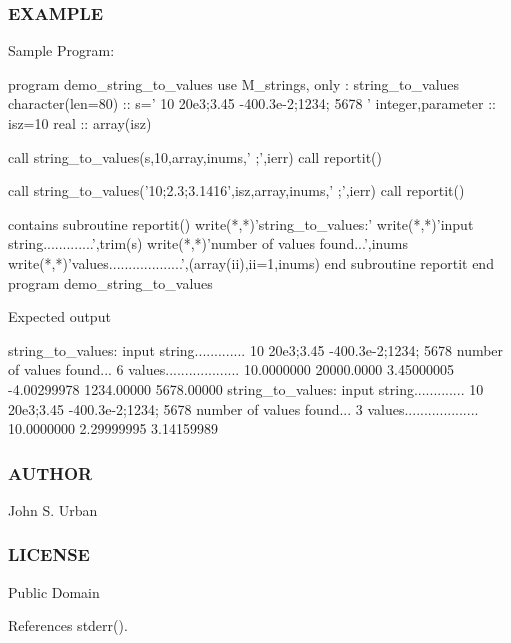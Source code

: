 \subsubsection*{E\+X\+A\+M\+P\+LE}

Sample Program\+: \begin{DoxyVerb} program demo_string_to_values
  use M_strings, only : string_to_values
  character(len=80)  :: s=' 10 20e3;3.45 -400.3e-2;1234; 5678 '
  integer,parameter  :: isz=10
  real               :: array(isz)

  call string_to_values(s,10,array,inums,' ;',ierr)
  call reportit()

  call string_to_values('10;2.3;3.1416',isz,array,inums,' ;',ierr)
  call reportit()

  contains
     subroutine reportit()
        write(*,*)'string_to_values:'
        write(*,*)'input string.............',trim(s)
        write(*,*)'number of values found...',inums
        write(*,*)'values...................',(array(ii),ii=1,inums)
     end subroutine reportit
 end program demo_string_to_values
\end{DoxyVerb}


Expected output \begin{DoxyVerb}string_to_values:
input string............. 10 20e3;3.45 -400.3e-2;1234; 5678
number of values found...           6
values...................   10.0000000  20000.0000  3.45000005  -4.00299978  1234.00000  5678.00000
string_to_values:
input string............. 10 20e3;3.45 -400.3e-2;1234; 5678
number of values found...           3
values...................   10.0000000  2.29999995  3.14159989
\end{DoxyVerb}
 \subsubsection*{A\+U\+T\+H\+OR}

John S. Urban \subsubsection*{L\+I\+C\+E\+N\+SE}

Public Domain 

References stderr().

